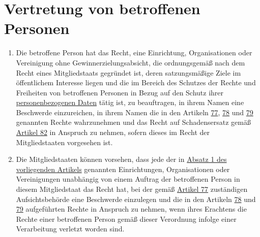 \chapter{Vertretung von betroffenen Personen}
\label{ch:80}


\begin{enumerate}

  \item Die betroffene Person hat das Recht, eine Einrichtung, Organisationen oder Vereinigung ohne
   Gewinnerzielungsabsicht, die ordnungsgemäß nach dem Recht eines Mitgliedstaats gegründet ist, deren satzungsmäßige
   Ziele im öffentlichem Interesse liegen und die im Bereich des Schutzes der Rechte und Freiheiten von betroffenen
   Personen in Bezug auf den Schutz ihrer \hyperref[itm:04-1]{personenbezogenen Daten} tätig ist, zu beauftragen, in ihrem Namen eine
   Beschwerde einzureichen, in ihrem Namen die in den Artikeln \hyperref[ch:77]{77}, \hyperref[ch:78]{78} und \hyperref
   [ch:79]{79} genannten Rechte wahrzunehmen und das Recht auf Schadensersatz gemäß \hyperref[ch:82]{Artikel 82} in
   Anspruch zu nehmen, sofern dieses im Recht der Mitgliedstaaten vorgesehen ist.
  \label{itm:80-1}

  \item Die Mitgliedstaaten können vorsehen, dass jede der in \hyperref[itm:80-1]{Absatz 1 des vorliegenden Artikels}
   genannten Einrichtungen, Organisationen oder Vereinigungen unabhängig von einem Auftrag der betroffenen Person in
   diesem Mitgliedstaat das Recht hat, bei der gemäß \hyperref[ch:77]{Artikel 77} zuständigen Aufsichtsbehörde eine
   Beschwerde einzulegen und die in den Artikeln \hyperref[ch:78]{78} und \hyperref[ch:79]{79} aufgeführten Rechte in
   Anspruch zu nehmen, wenn ihres Erachtens die Rechte einer betroffenen Person gemäß dieser Verordnung infolge einer
   Verarbeitung verletzt worden sind.
  \label{itm:80-2}

\end{enumerate}


